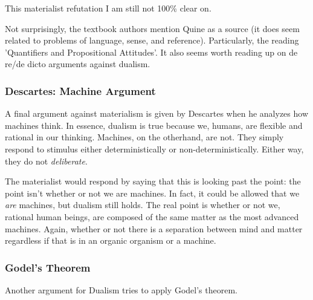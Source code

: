 \begin{remark}
   This materialist refutation I am still not 100\% clear on.

   Not surprisingly, the textbook authors mention Quine as a source (it does seem related to problems of language, sense, and reference). Particularly, the reading 'Quantifiers and Propositional Attitudes'. It also seems worth reading up on de re/de dicto arguments against dualism.
\end{remark}

\subsubsection{Descartes: Machine Argument}

A final argument against materialism is given by Descartes when he analyzes how machines think. In essence, dualism is true because we, humans, are flexible and rational in our thinking. Machines, on the otherhand, are not. They simply respond to stimulus either deterministically or non-deterministically. Either way, they do not \textit{deliberate}.

The materialist would respond by saying that this is looking past the point: the point isn't whether or not we are machines. In fact, it could be allowed that we \textit{are} machines, but dualism still holds. The real point is whether or not we, rational human beings, are composed of the same matter as the most advanced machines. Again, whether or not there is a separation between mind and matter regardless if that is in an organic organism or a machine. 

\subsubsection{Godel's Theorem}

Another argument for Dualism tries to apply Godel's theorem.
